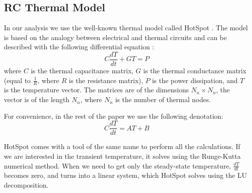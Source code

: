 \subsection{RC Thermal Model}
In our analysis we use the well-known thermal model called HotSpot \cite{huang2006}. The model is based on the analogy between electrical and thermal circuits and can be described with the following differential equation \cite{rao2008}:
\[
  C \frac{dT}{dt} + G T = P
\]
where $C$ is the thermal capacitance matrix, $G$ is the thermal conductance matrix (equal to $\frac{1}{R}$, where $R$ is the resistance matrix), $P$ is the power dissipation, and $T$ is the temperature vector. The matrices are of the dimensions $N_n \times N_n$, the vector is of the length $N_n$, where $N_n$ is the number of thermal nodes.

For convenience, in the rest of the paper we use the following denotation:
\begin{equation} \label{eq:initial}
  C \frac{dT}{dt} = A T + B
\end{equation}

HotSpot comes with a tool of the same name to perform all the calculations. If we are interested in the transient temperature, it solves  using the Runge-Kutta numerical method. When we need to get only the steady-state temperature, $\frac{dT}{dt}$ becomes zero, and  turns into a linear system, which HotSpot solves using the LU decomposition.

